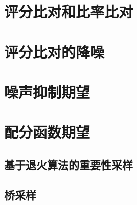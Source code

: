 \section{评分比对和比率比对}
\label{sec:18.4}

\section{评分比对的降噪}
\label{sec:18.5}

\section{噪声抑制期望}
\label{sec:18.6}

\section{配分函数期望}
\label{sec:18.7}

\subsection{基于退火算法的重要性采样}
\label{sec:18.7.1}

\subsection{桥采样}
\label{sec:18.7.2}